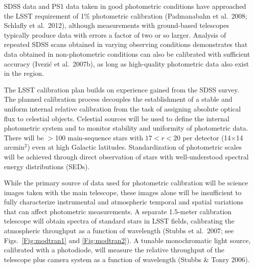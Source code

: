 \documentclass{emulateapj}
\begin{document}
SDSS data and PS1 data 
taken in good photometric conditions have approached the LSST
requirement of 1\% photometric calibration
(Padmanabahn et al.~2008; Schlafly et al.~2012), although measurements with ground-based telescopes 
typically produce data with errors a factor of two or so larger. Analysis of
repeated SDSS scans obtained in varying observing conditions demonstrates that data
obtained in 
non-photometric conditions can also be calibrated with
sufficient accuracy (Ivezi\'{c} et al.~2007b), as long as high-quality
photometric data also exist in the region. 

The LSST calibration plan builds on experience gained from the SDSS survey. 
The planned calibration process decouples the establishment of a stable and uniform internal 
relative calibration from the task of assigning absolute optical flux to 
celestial objects. 
Celestial sources will be used to define the internal photometric system and 
to monitor stability and uniformity of photometric data. There will be 
$>$100 main-sequence stars with $17<r<20$ per detector (14$\times$14 arcmin$^2$) 
even at high Galactic latitudes. Standardization of photometric scales will be 
achieved through direct observation of stars with well-understood spectral 
energy distributions (SEDs). 

While the primary source of data used for photometric calibration will be 
science images taken with the main telescope, these images alone will be 
insufficient to fully characterize instrumental and atmospheric temporal and 
spatial variations that can affect photometric measurements.  A
separate 1.5-meter calibration telescope will obtain spectra of
standard stars in LSST fields, calibrating the atmospheric throughput
as a function of wavelength  (Stubbs et al.~2007; 
see Figs.~\ref{Fig:modtran1} and \ref{Fig:modtran2}).  A tunable
monochromatic light source, calibrated with a photodiode, will measure
the relative throughput of the telescope plus camera system as a
function of wavelength (Stubbs \& Tonry 2006).  
\end{document}
